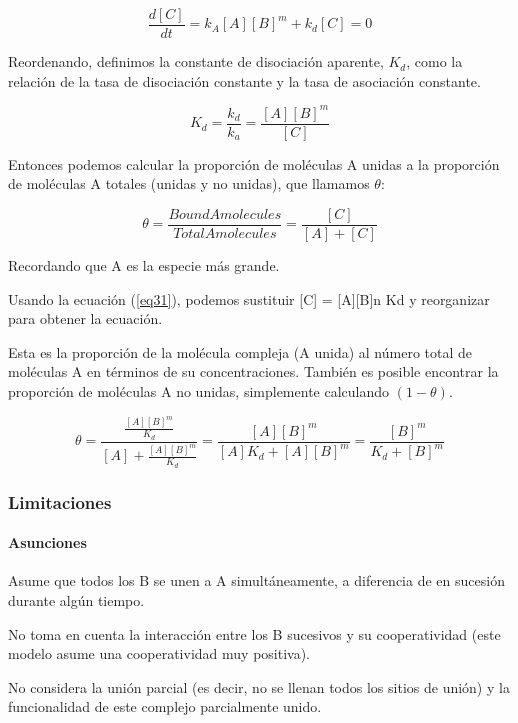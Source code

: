 \documentclass[11pt, letterpaper, spanish]{article}
\begin{document}
{    \begin{equation}
        \frac{d [C]}{d t}=k_A{[A]}[B]^m+k_d[C]=0
    \end{equation}

    \par{Reordenando, definimos la constante de disociación aparente, $K_d$, como la relación de la tasa de disociación constante y la tasa de asociación constante.} 

    \begin{equation}
        K_d = \frac{k_d}{k_a}=\frac{[A]{[B]}^m}{[C]}
        \label{eq31}
    \end{equation}

    \par{ Entonces podemos calcular la proporción de moléculas A unidas a la proporción de moléculas A totales (unidas y no unidas), que llamamos $\theta$: }

    \begin{equation}
        \theta= \frac{Bound A molecules}{Total A molecules}=\frac{[C]}{[A]+[C]}
    \end{equation}
    
    \par{Recordando que A es la especie más grande.}
    
    \par{Usando la ecuación (\ref{eq31}), podemos sustituir [C] = [A][B]n Kd y reorganizar para obtener la ecuación.} 
    
    \par{Esta es la proporción de la molécula compleja (A unida) al número total de moléculas A en términos de su concentraciones. También es posible encontrar la proporción de moléculas A no unidas, simplemente calculando $(1-\theta)$}.

    \begin{equation}
        \theta = \frac{ \frac{[A]{[B]}^m}{K_d} }{ [A] + \frac{[A]{[B]}^m}{K_d} }= \frac{[A]{[B]}^m}{[A] K_d + [A] {[B]}^m} = \frac{{[B]}^m}{ K_d + {[B]}^m}
    \end{equation}

    \subsubsection{Limitaciones}
    
    \paragraph{Asunciones}
    \par{Asume que todos los B se unen a A simultáneamente, a diferencia de en sucesión durante algún tiempo.}
     \par{No toma en cuenta la interacción entre los B sucesivos y su cooperatividad (este modelo asume una cooperatividad muy positiva).}
 \par{ No considera la unión parcial (es decir, no se llenan todos los sitios de unión) y la funcionalidad de este complejo parcialmente unido.}

}
\end{document}
